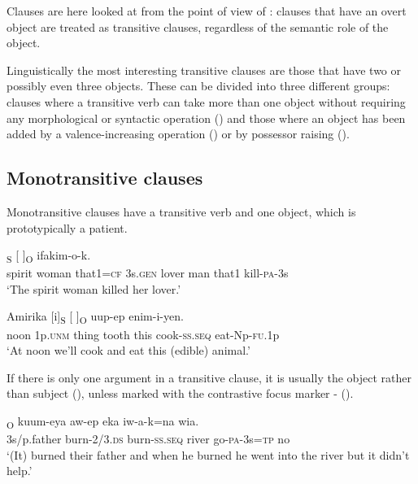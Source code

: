 Clauses are here looked at from the point of view of : clauses that have an overt object are treated as transitive clauses, regardless of the semantic role of the object. 

Linguistically the most interesting transitive clauses are those that have two or possibly even three objects. These can be divided into three different groups: clauses where a transitive verb can take more than one object without requiring any morphological or syntactic operation () and those where an object has been added by a valence-increasing operation () or by possessor raising ().

\subsection{Monotransitive clauses}
\hypertarget{RefHeading21981935131865}{}
Monotransitive clauses have a transitive verb and one object, which is prototypically a patient. 

\ea%
\label{ex:x937}
\gll [Sawur  emeria  nain=ke]\textsubscript{S}  [   ]\textsubscript{O}  ifakim-o-k. \\
     spirit  woman  that1=\textsc{cf}  3s.\textsc{gen}  lover  man  that1  kill-\textsc{pa}-3s \\
\glt `The spirit woman killed her lover.'
\z

\ea%
\label{ex:x939}
\gll Amirika  [i]\textsubscript{S}  [  ]\textsubscript{O}  uup-ep enim-i-yen. \\
     noon  1p.\textsc{unm}  thing  tooth  this  cook-\textsc{ss}.\textsc{seq} eat-Np-\textsc{fu}.1p \\
\glt `At noon we'll cook and eat this (edible) animal.'
\z

If there is only one  argument in a transitive clause, it is usually the object rather than subject (), unless marked with the contrastive focus marker - ().

\ea%
\label{ex:x941}
\textsubscript{O}  kuum-eya  aw-ep  eka  iw-a-k=na  wia. \\
     3s/p.father  burn-2/3.\textsc{ds}  burn-\textsc{ss}.\textsc{seq}  river  go-\textsc{pa}-3s=\textsc{tp}  no \\
\glt `(It) burned their father and when he burned he went into the river but it didn't help.'
\z

